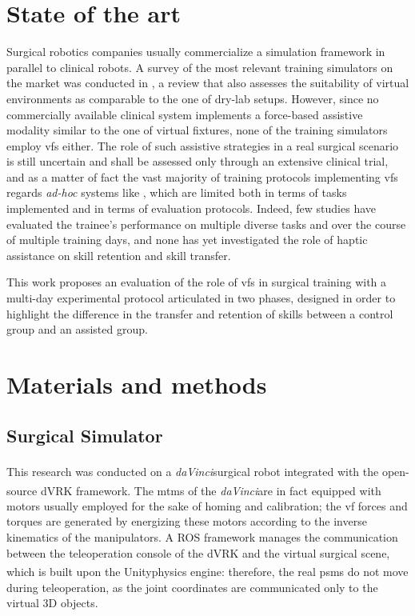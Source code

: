 \documentclass{article}
\newcommand{\cright}{\textsuperscript{\textregistered}\phantom{..}}
\begin{document}
\begin{multicols}{2}
\section{State of the art}
Surgical robotics companies usually commercialize a simulation framework in parallel to clinical robots. A survey of the most relevant training simulators on the market was conducted in \cite{Bric2016}, a review that also assesses the suitability of virtual environments as comparable to the one of dry-lab setups. However, since no commercially available clinical system implements a force-based assistive modality similar to the one of virtual fixtures, none of the training simulators employ \acp{vf} either. The role of such assistive strategies in a real surgical scenario is still uncertain and shall be assessed only through an extensive clinical trial, and as a matter of fact the vast majority of training protocols implementing \acp{vf} regards \textit{ad-hoc} systems like \cite{Lin2014}, which are limited both in terms of tasks implemented and in terms of evaluation protocols. Indeed, few studies \cite{Enayati2018} have evaluated the trainee's performance on multiple diverse tasks and over the course of multiple training days, and none has yet investigated the role of haptic assistance on skill retention and skill transfer. 

This work proposes an evaluation of the role of \acp{vf} in surgical training with a multi-day experimental protocol articulated in two phases, designed in order to highlight the difference in the transfer and retention of skills between a control group and an assisted group. 
\section{Materials and methods}
\subsection{Surgical Simulator}
This research was conducted on a \textit{daVinci}\cright surgical robot integrated with the open-source dVRK \cite{Kazanzidesf2014} framework. The \acp{mtm} of the \textit{daVinci}\cright are in fact equipped with motors usually employed for the sake of homing and calibration; the \ac{vf} forces and torques are generated by energizing these motors according to the inverse kinematics of the manipulators. A ROS \cite{ros} framework manages the communication between the teleoperation console of the dVRK and the virtual surgical scene, which is built upon the Unity\cright physics engine: therefore, the real \acp{psm} do not move during teleoperation, as the joint coordinates are communicated only to the virtual 3D objects.


\end{multicols}
\end{document}
